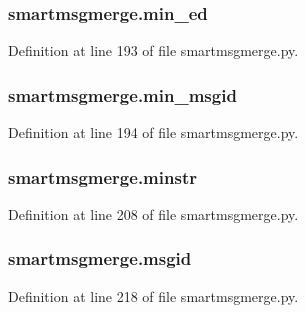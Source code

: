 \subsubsection[{\texorpdfstring{min\+\_\+ed}{min_ed}}]{\setlength{\rightskip}{0pt plus 5cm}smartmsgmerge.\+min\+\_\+ed}\hypertarget{namespacesmartmsgmerge_a8b0d2e9d5f279d2f36d5fca526d33b0b}{}\label{namespacesmartmsgmerge_a8b0d2e9d5f279d2f36d5fca526d33b0b}


Definition at line 193 of file smartmsgmerge.\+py.

\subsubsection[{\texorpdfstring{min\+\_\+msgid}{min_msgid}}]{\setlength{\rightskip}{0pt plus 5cm}smartmsgmerge.\+min\+\_\+msgid}\hypertarget{namespacesmartmsgmerge_afa50b3b893ba3cfc50357dc19c5e6c4b}{}\label{namespacesmartmsgmerge_afa50b3b893ba3cfc50357dc19c5e6c4b}


Definition at line 194 of file smartmsgmerge.\+py.

\subsubsection[{\texorpdfstring{minstr}{minstr}}]{\setlength{\rightskip}{0pt plus 5cm}smartmsgmerge.\+minstr}\hypertarget{namespacesmartmsgmerge_a6e25c3f9695b423ab77089934b94b7cc}{}\label{namespacesmartmsgmerge_a6e25c3f9695b423ab77089934b94b7cc}


Definition at line 208 of file smartmsgmerge.\+py.

\subsubsection[{\texorpdfstring{msgid}{msgid}}]{\setlength{\rightskip}{0pt plus 5cm}smartmsgmerge.\+msgid}\hypertarget{namespacesmartmsgmerge_a16869be066022ccc5e31e730a1a2eb5d}{}\label{namespacesmartmsgmerge_a16869be066022ccc5e31e730a1a2eb5d}


Definition at line 218 of file smartmsgmerge.\+py.

